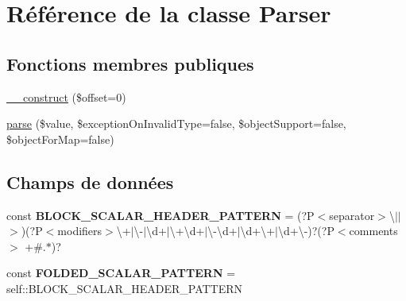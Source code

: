 \hypertarget{class_symfony_1_1_component_1_1_yaml_1_1_parser}{}\section{Référence de la classe Parser}
\label{class_symfony_1_1_component_1_1_yaml_1_1_parser}
\subsection*{Fonctions membres publiques}
\begin{DoxyCompactItemize}
\item 
\hyperlink{class_symfony_1_1_component_1_1_yaml_1_1_parser_aa9388d8255ba88ef404307c6aee9fb37}{\+\_\+\+\_\+construct} (\$offset=0)
\item 
\hyperlink{class_symfony_1_1_component_1_1_yaml_1_1_parser_a49c7dabdc9cb56fafe5d8ae3d3da9875}{parse} (\$value, \$exception\+On\+Invalid\+Type=false, \$object\+Support=false, \$object\+For\+Map=false)
\end{DoxyCompactItemize}
\subsection*{Champs de données}
\begin{DoxyCompactItemize}
\item 
const {\bfseries B\+L\+O\+C\+K\+\_\+\+S\+C\+A\+L\+A\+R\+\_\+\+H\+E\+A\+D\+E\+R\+\_\+\+P\+A\+T\+T\+E\+RN} = \textquotesingle{}(?P$<$separator$>$\textbackslash{}$\vert$$\vert$$>$)(?P$<$modifiers$>$\textbackslash{}+$\vert$\textbackslash{}-\/$\vert$\textbackslash{}d+$\vert$\textbackslash{}+\textbackslash{}d+$\vert$\textbackslash{}-\/\textbackslash{}d+$\vert$\textbackslash{}d+\textbackslash{}+$\vert$\textbackslash{}d+\textbackslash{}-\/)?(?P$<$comments$>$ +\#.$\ast$)?\textquotesingle{}\hypertarget{class_symfony_1_1_component_1_1_yaml_1_1_parser_a76585a097a4e94d76ade259db4dfdfeb}{}\label{class_symfony_1_1_component_1_1_yaml_1_1_parser_a76585a097a4e94d76ade259db4dfdfeb}

\item 
const {\bfseries F\+O\+L\+D\+E\+D\+\_\+\+S\+C\+A\+L\+A\+R\+\_\+\+P\+A\+T\+T\+E\+RN} = self\+::\+B\+L\+O\+C\+K\+\_\+\+S\+C\+A\+L\+A\+R\+\_\+\+H\+E\+A\+D\+E\+R\+\_\+\+P\+A\+T\+T\+E\+RN\hypertarget{class_symfony_1_1_component_1_1_yaml_1_1_parser_a51c93db0083ddaae3c20fde103372410}{}\label{class_symfony_1_1_component_1_1_yaml_1_1_parser_a51c93db0083ddaae3c20fde103372410}

\end{DoxyCompactItemize}


